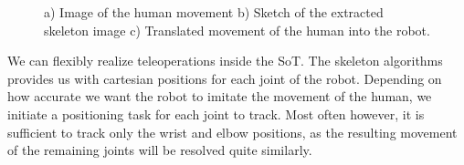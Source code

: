 \begin{figure}[h!]
  \centering
	\caption{a) Image of the human movement b) Sketch of the extracted skeleton image c) Translated movement of the human into the robot.}
    \label{fig:teleop}
\end{figure}

We can flexibly realize teleoperations inside the SoT. The skeleton algorithms provides us with cartesian positions for each joint of the robot. Depending on how accurate we want the robot to imitate the movement of the human, we initiate a positioning task for each joint to track. Most often however, it is sufficient to track only the wrist and elbow positions, as the resulting movement of the remaining joints will be resolved quite similarly. 
\newpage
